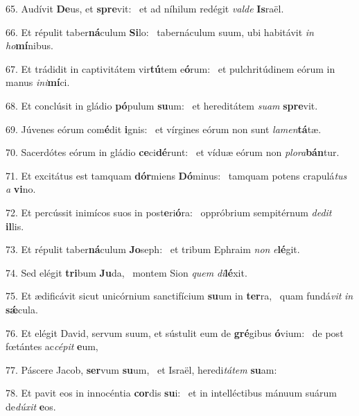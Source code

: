 65. Audívit \textbf{De}us, et \textbf{spre}vit: \ast\  et ad níhilum redégit \textit{val}\textit{de} \textbf{Is}raël.\

66. Et répulit taber\textbf{ná}culum \textbf{Si}lo: \ast\  tabernáculum suum, ubi habitávit \textit{in} \textit{ho}\textbf{mí}nibus.\

67. Et trádidit in captivitátem vir\textbf{tú}tem e\textbf{ó}rum: \ast\  et pulchritúdinem eórum in manus \textit{in}\textit{i}\textbf{mí}ci.\

68. Et conclúsit in gládio \textbf{pó}pulum \textbf{su}um: \ast\  et hereditátem \textit{su}\textit{am} \textbf{spre}vit.\

69. Júvenes eórum com\textbf{é}dit \textbf{i}gnis: \ast\  et vírgines eórum non sunt \textit{la}\textit{men}\textbf{tá}tæ.\

70. Sacerdótes eórum in gládio \textbf{ce}ci\textbf{dé}runt: \ast\  et víduæ eórum non \textit{plo}\textit{ra}\textbf{bán}tur.\

71. Et excitátus est tamquam \textbf{dór}miens \textbf{Dó}minus: \ast\  tamquam potens crapulá\textit{tus} \textit{a} \textbf{vi}no.\

72. Et percússit inimícos suos in post\textbf{e}ri\textbf{ó}ra: \ast\  oppróbrium sempitérnum \textit{de}\textit{dit} \textbf{il}lis.\

73. Et répulit taber\textbf{ná}culum \textbf{Jo}seph: \ast\  et tribum Ephraim \textit{non} \textit{e}\textbf{lé}git.\

74. Sed elégit \textbf{tri}bum \textbf{Ju}da, \ast\  montem Sion \textit{quem} \textit{di}\textbf{lé}xit.\

75. Et ædificávit sicut unicórnium sanctifícium \textbf{su}um in \textbf{ter}ra, \ast\  quam fundá\textit{vit} \textit{in} \textbf{sǽ}cula.\

76. Et elégit David, servum suum, et sústulit eum de \textbf{gré}gibus \textbf{ó}vium: \ast\  de post fœtántes ac\textit{cé}\textit{pit} \textbf{e}um,\

77. Páscere Jacob, \textbf{ser}vum \textbf{su}um, \ast\  et Israël, heredi\textit{tá}\textit{tem} \textbf{su}am:\

78. Et pavit eos in innocéntia \textbf{cor}dis \textbf{su}i: \ast\  et in intelléctibus mánuum suárum de\textit{dú}\textit{xit} \textbf{e}os.\

